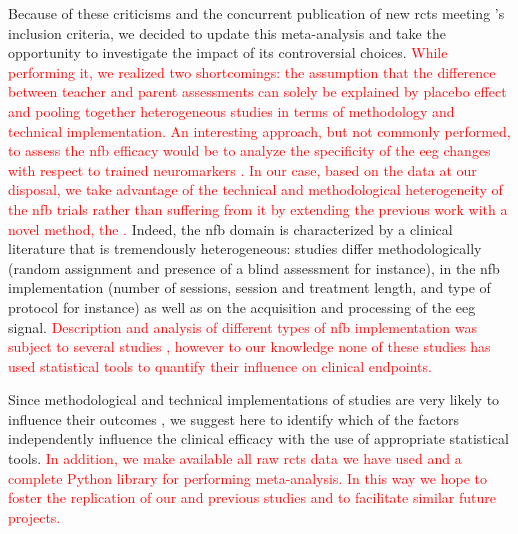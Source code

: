 Because of these criticisms and the concurrent publication of new \glspl{rct} meeting \citeauthor{Cortese2016}'s inclusion criteria, we
decided to update this meta-analysis and take the opportunity to investigate the impact of its controversial choices.
\textcolor{red}{While performing it, we realized two shortcomings: the assumption that the difference between teacher and parent
assessments can solely be explained by placebo effect and pooling together heterogeneous studies in terms of methodology and technical
implementation. An interesting approach, but not commonly performed, to assess the \gls{nfb} efficacy would be to analyze the specificity of the \gls{eeg} changes with respect 
to trained neuromarkers \citep{Maurizio2014}. In our case, based on the data at our disposal, we take advantage of the technical and methodological heterogeneity 
of the \gls{nfb} trials rather than suffering from it by extending the previous work with a novel method, the .} Indeed, the \gls{nfb} domain is 
characterized by a clinical literature that is tremendously heterogeneous: studies differ methodologically (random assignment and 
presence of a blind assessment for instance), in the \gls{nfb} implementation (number of sessions, session and treatment length,
and type of protocol for instance) as well as on the acquisition and processing of the \gls{eeg} signal. \textcolor{red}{Description and analysis of different types 
of \gls{nfb} implementation was subject to several studies \citep{Arns2014, Enriquez2017, Vernon2004, Jeunet2018}, however to our knowledge none of these studies has used statistical 
tools to quantify their influence on clinical endpoints.}

Since methodological and technical implementations of studies are very likely to influence their outcomes \citep{Congedo2004}, we suggest 
here to identify which of the factors independently influence the clinical efficacy with the use of appropriate statistical tools. 
\textcolor{red}{In addition, we make available all raw \glspl{rct} data we have used and a complete Python library for performing meta-analysis. 
In this way we hope to foster the replication of our and previous studies and to facilitate similar future projects.}







